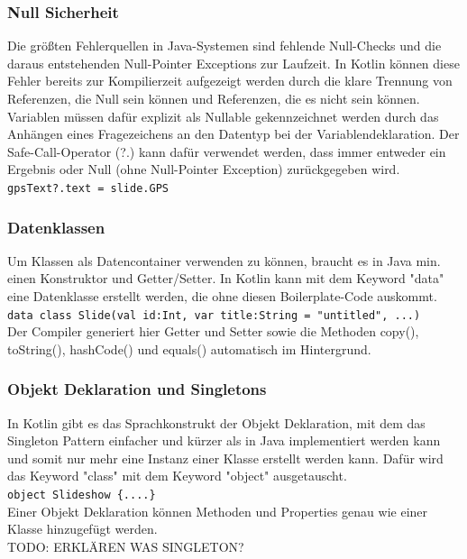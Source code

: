 \documentclass{sigchi-ext}
\begin{document}
\subsubsection{Null Sicherheit}
Die größten Fehlerquellen in Java-Systemen sind fehlende Null-Checks und die daraus entstehenden Null-Pointer Exceptions zur Laufzeit. In Kotlin können diese Fehler bereits zur Kompilierzeit aufgezeigt werden durch die klare Trennung von Referenzen, die Null sein können und Referenzen, die es nicht sein können. Variablen müssen dafür explizit als Nullable gekennzeichnet werden durch das Anhängen eines Fragezeichens an den Datentyp bei der Variablendeklaration. Der Safe-Call-Operator (?.) kann dafür verwendet werden, dass immer entweder ein Ergebnis oder Null (ohne Null-Pointer Exception) zurückgegeben wird. \cite{moskala2017android} \\ \texttt{gpsText?.text = slide.GPS} \\ 

\subsubsection{Datenklassen}
Um Klassen als Datencontainer verwenden zu können, braucht es in Java min. einen Konstruktor und Getter/Setter. In Kotlin kann mit dem Keyword "data" eine Datenklasse erstellt werden, die ohne diesen Boilerplate-Code auskommt. \\ \texttt{data class Slide(val id:Int,
                 var title:String = "untitled", ...)} \\ Der Compiler generiert hier Getter und Setter sowie die Methoden copy(), toString(), hashCode() und equals() automatisch im Hintergrund.
\cite{samuel2017programming} 

\subsubsection{Objekt Deklaration und Singletons}
In Kotlin gibt es das Sprachkonstrukt der Objekt Deklaration, mit dem das Singleton Pattern einfacher und kürzer als in Java implementiert werden kann und somit nur mehr eine Instanz einer Klasse erstellt werden kann. Dafür wird das Keyword "class" mit dem Keyword "object" ausgetauscht. \\\texttt{object Slideshow \{....\}} \\Einer Objekt Deklaration können Methoden und Properties genau wie einer Klasse hinzugefügt werden. \cite{moskala2017android} \\TODO: ERKLÄREN WAS SINGLETON?
\end{document}
